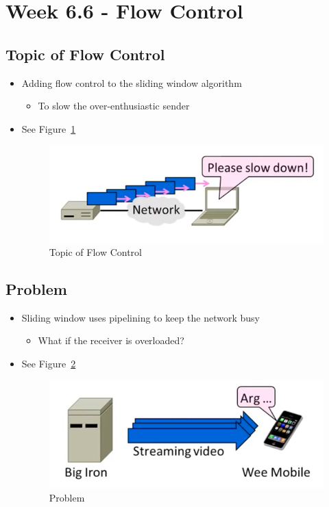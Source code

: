 \documentclass[12pt]{ctexart}   %
\begin{document}
\section{Week 6.6 - Flow Control}
	\subsection{Topic of Flow Control}
	\begin{itemize}
		\item Adding flow control to the sliding window algorithm
		\begin{itemize}
			\item To slow the over-enthusiastic sender
		\end{itemize}
		\item See Figure~\ref{fig:6-6-1}
		  
		 \begin{figure}[h!] %
		\centering
		 \includegraphics[scale=0.7]{images/6-6-1}
		\caption{  Topic of Flow Control }
		 \label{fig:6-6-1}
		 \end{figure}
	\end{itemize}
	
	\subsection{Problem}
	\begin{itemize}
		\item Sliding window uses pipelining to keep the network busy
		\begin{itemize}
			\item What if the receiver is overloaded?
		\end{itemize}
		\item See Figure~\ref{fig:6-6-2}
		  
		 \begin{figure}[h!] %
		\centering
		 \includegraphics[scale=0.7]{images/6-6-2}
		\caption{  Problem }
		 \label{fig:6-6-2}
		 \end{figure}
	\end{itemize}
	
\end{document}
